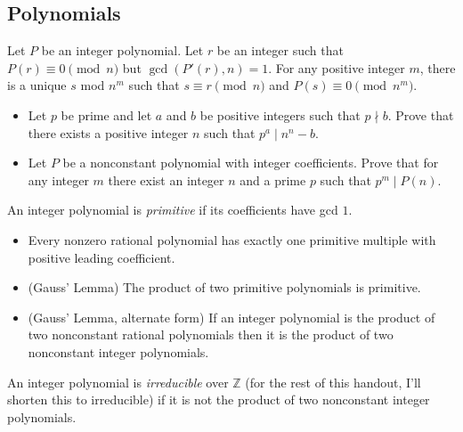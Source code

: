 \subsection{Polynomials}
\begin{result}{\label{r:a:n:p:1}}
Let $P$ be an integer polynomial.
Let $r$ be an integer such that $P(r)\equiv 0\pmod n$ but $\gcd(P'(r),n)=1$.
For any positive integer $m$, there is a unique $s$ mod $n^m$ such
that $s\equiv r\pmod n$ and $P(s)\equiv 0\pmod {n^m}$.
\end{result}
\begin{itemize}
  \item Let $p$ be prime and let $a$ and $b$ be positive integers such that
    $p\nmid b$. Prove that there exists a positive integer $n$ such that
    $p^a\mid n^n-b$.
  \item Let $P$ be a nonconstant polynomial with integer coefficients. Prove that for any
    integer $m$ there exist an integer $n$ and a prime $p$ such that $p^m\mid
    P(n)$.
\end{itemize}
An integer polynomial is \emph{primitive} if its coefficients have gcd $1$.
\begin{itemize}
  \item Every nonzero rational polynomial has exactly one primitive multiple
    with positive leading coefficient.
  \item (Gauss' Lemma) The product of two primitive polynomials is primitive.
  \item (Gauss' Lemma, alternate form) If an integer polynomial is the product
    of two nonconstant rational polynomials then it is the product of two
    nonconstant integer polynomials.
\end{itemize}
An integer polynomial is \emph{irreducible} over $\mathbb Z$ (for the rest of
this handout, I'll shorten this to irreducible) if it is not the product of two
nonconstant integer polynomials.

